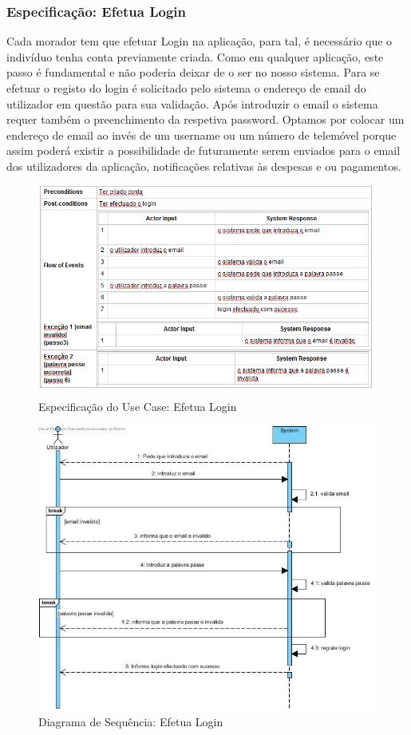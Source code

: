 \subsubsection{Especificação: Efetua Login }
Cada morador tem que efetuar Login na aplicação, para tal, é necessário que o indivíduo tenha conta previamente criada. Como em qualquer aplicação, este passo é fundamental e não poderia deixar de o ser no nosso sistema. Para se efetuar o registo do login é solicitado pelo sistema o endereço de email do utilizador em questão para sua validação. Após introduzir o email o sistema requer também o preenchimento da respetiva password. Optamos por colocar um endereço de email ao invés de um username ou um número de telemóvel porque assim poderá existir a possibilidade de futuramente serem enviados para o email dos utilizadores da aplicação, notificações relativas às despesas e ou pagamentos.

\begin{figure}[htb!]
	\centering
	\includegraphics[scale=0.6]{imagens/Especificacoes/efetualogin}  
	\caption{Especificação do Use Case: Efetua Login  }  
\end{figure}


\begin{figure}[htb!]
	\centering
	\includegraphics[scale=0.5]{imagens/diagramaSeq/Login}  
	\caption{Diagrama de Sequência: Efetua Login }  
\end{figure}



